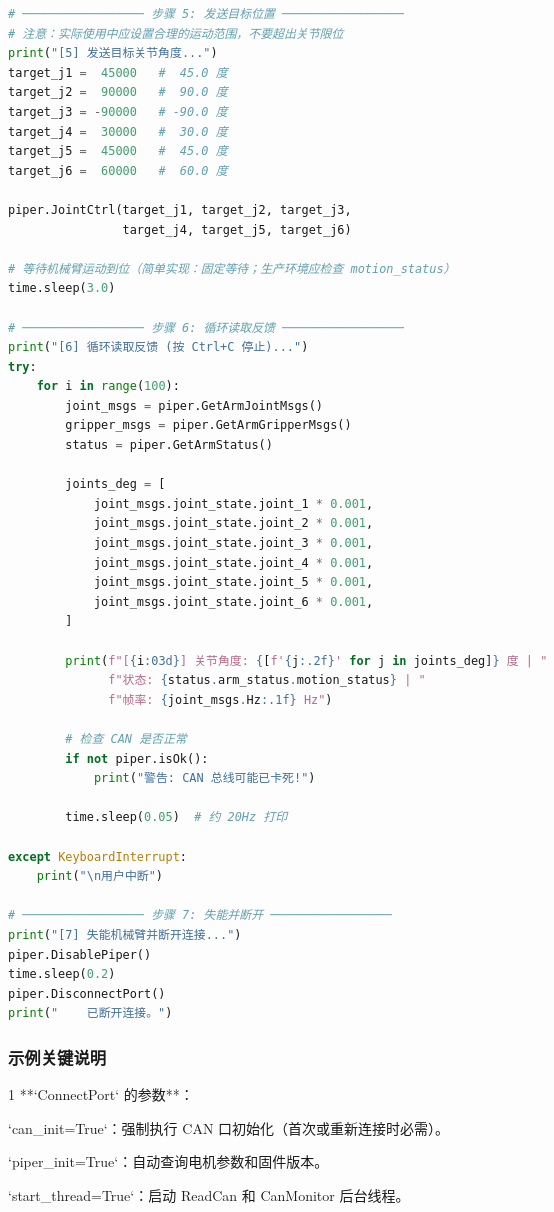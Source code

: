 \documentclass[UTF8,a4paper,11pt]{ctexart}
\begin{document}
\begin{lstlisting}[language=python]
# ───────────────── 步骤 5: 发送目标位置 ─────────────────
# 注意：实际使用中应设置合理的运动范围，不要超出关节限位
print("[5] 发送目标关节角度...")
target_j1 =  45000   #  45.0 度
target_j2 =  90000   #  90.0 度
target_j3 = -90000   # -90.0 度
target_j4 =  30000   #  30.0 度
target_j5 =  45000   #  45.0 度
target_j6 =  60000   #  60.0 度

piper.JointCtrl(target_j1, target_j2, target_j3,
                target_j4, target_j5, target_j6)

# 等待机械臂运动到位（简单实现：固定等待；生产环境应检查 motion_status）
time.sleep(3.0)

# ───────────────── 步骤 6: 循环读取反馈 ─────────────────
print("[6] 循环读取反馈 (按 Ctrl+C 停止)...")
try:
    for i in range(100):
        joint_msgs = piper.GetArmJointMsgs()
        gripper_msgs = piper.GetArmGripperMsgs()
        status = piper.GetArmStatus()

        joints_deg = [
            joint_msgs.joint_state.joint_1 * 0.001,
            joint_msgs.joint_state.joint_2 * 0.001,
            joint_msgs.joint_state.joint_3 * 0.001,
            joint_msgs.joint_state.joint_4 * 0.001,
            joint_msgs.joint_state.joint_5 * 0.001,
            joint_msgs.joint_state.joint_6 * 0.001,
        ]

        print(f"[{i:03d}] 关节角度: {[f'{j:.2f}' for j in joints_deg]} 度 | "
              f"状态: {status.arm_status.motion_status} | "
              f"帧率: {joint_msgs.Hz:.1f} Hz")

        # 检查 CAN 是否正常
        if not piper.isOk():
            print("警告: CAN 总线可能已卡死!")

        time.sleep(0.05)  # 约 20Hz 打印

except KeyboardInterrupt:
    print("\n用户中断")

# ───────────────── 步骤 7: 失能并断开 ─────────────────
print("[7] 失能机械臂并断开连接...")
piper.DisablePiper()
time.sleep(0.2)
piper.DisconnectPort()
print("    已断开连接。")
\end{lstlisting}

\subsubsection{示例关键说明}

\item[1] **`ConnectPort` 的参数**：
\item `can_init=True`：强制执行 CAN 口初始化（首次或重新连接时必需）。
\item `piper_init=True`：自动查询电机参数和固件版本。
\item `start_thread=True`：启动 ReadCan 和 CanMonitor 后台线程。
\end{document}
